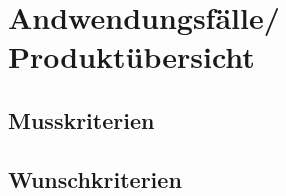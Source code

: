 \section{Andwendungsfälle/ Produktübersicht}
\subsection{Musskriterien}
\subsection{Wunschkriterien}